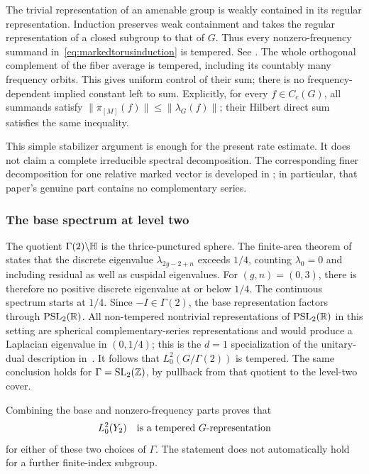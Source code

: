 The trivial representation of an amenable group is weakly
contained in its regular representation. Induction preserves
weak containment and takes the regular representation of a closed
subgroup to that of $G$. Thus every nonzero-frequency summand
in~\eqref{eq:markedtorusinduction} is tempered. See
\cite[Lemma 2.3 and Remark 2.4]{BenoistKobayashi}.
The whole orthogonal complement of the fiber average is tempered,
including its countably many frequency orbits. This gives uniform
control of their sum; there is no frequency-dependent implied
constant left to sum. Explicitly, for every $f\in C_c(G)$, all
summands satisfy $\|\pi_{[M]}(f)\|\leq\|\lambda_G(f)\|$;
their Hilbert direct sum satisfies the same inequality.

This simple stabilizer argument is enough for the present rate
estimate. It does not claim a complete irreducible spectral
decomposition. The corresponding finer decomposition for one
relative marked vector is developed in
\cite{AthreyaLagaceMollerRaum}; in particular, that paper's genuine
part contains no complementary series.

\subsubsection*{The base spectrum at level two}

The quotient $\Gamma(2)\backslash\mathbb H$ is the thrice-punctured
sphere. The finite-area theorem of
\cite[Theorem 2]{OtalRosas} states that the discrete eigenvalue
$\lambda_{2g-2+n}$ exceeds $1/4$, counting $\lambda_0=0$ and
including residual as well as cuspidal eigenvalues. For $(g,n)=(0,3)$,
there is therefore no positive discrete eigenvalue at or below
$1/4$. The continuous spectrum starts at $1/4$.
Since $-I\in\Gamma(2)$, the base representation factors through
$\operatorname{PSL}_2(\mathbb R)$. All non-tempered nontrivial representations of
$\operatorname{PSL}_2(\mathbb R)$ in this setting are spherical
complementary-series representations and would produce a
Laplacian eigenvalue in $(0,1/4)$; this is the $d=1$ specialization of
the unitary-dual description in~\cite[Section~1]{EdwardsOhMixing}.
It follows that
$L^2_0(G/\Gamma(2))$ is tempered. The same conclusion holds for
$\Gamma=\operatorname{SL}_2(\mathbb Z)$, by pullback from that quotient
to the level-two cover.

Combining the base and nonzero-frequency parts proves that
\begin{equation}
 L^2_0(Y_2)\quad\hbox{is a tempered $G$-representation}
 \label{eq:markedtorusalltempered}
\end{equation}
for either of these two choices of $\Gamma$. The statement does
not automatically hold for a further finite-index subgroup.

